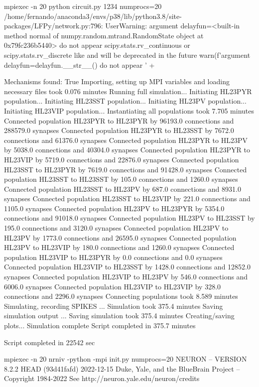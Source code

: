 mpiexec -n 20 python circuit.py 1234
numprocs=20
/home/fernando/anaconda3/envs/p38/lib/python3.8/site-packages/LFPy/network.py:796: UserWarning: argument delayfun=<built-in method normal of numpy.random.mtrand.RandomState object at 0x79fc236b5440> do not appear scipy.stats.rv_continuous or scipy.stats.rv_discrete like and will be deprecated in the future
  warn(f'argument delayfun={delayfun.__str__()} do not appear ' +

Mechanisms found:  True
Importing, setting up MPI variables and loading necessary files took  0.076 minutes
Running full simulation...
Initiating HL23PYR population...
Initiating HL23SST population...
Initiating HL23PV population...
Initiating HL23VIP population...
Instantiating all populations took  7.705 minutes
Connected population HL23PYR to HL23PYR by 96193.0 connections and 288579.0 synapses
Connected population HL23PYR to HL23SST by 7672.0 connections and 61376.0 synapses
Connected population HL23PYR to HL23PV by 5038.0 connections and 40304.0 synapses
Connected population HL23PYR to HL23VIP by 5719.0 connections and 22876.0 synapses
Connected population HL23SST to HL23PYR by 7619.0 connections and 91428.0 synapses
Connected population HL23SST to HL23SST by 105.0 connections and 1260.0 synapses
Connected population HL23SST to HL23PV by 687.0 connections and 8931.0 synapses
Connected population HL23SST to HL23VIP by 221.0 connections and 1105.0 synapses
Connected population HL23PV to HL23PYR by 5354.0 connections and 91018.0 synapses
Connected population HL23PV to HL23SST by 195.0 connections and 3120.0 synapses
Connected population HL23PV to HL23PV by 1773.0 connections and 26595.0 synapses
Connected population HL23PV to HL23VIP by 180.0 connections and 1260.0 synapses
Connected population HL23VIP to HL23PYR by 0.0 connections and 0.0 synapses
Connected population HL23VIP to HL23SST by 1428.0 connections and 12852.0 synapses
Connected population HL23VIP to HL23PV by 546.0 connections and 6006.0 synapses
Connected population HL23VIP to HL23VIP by 328.0 connections and 2296.0 synapses
Connecting populations took  8.589 minutes
Simulating, recording SPIKES ... 
Simulation took  375.4 minutes
Saving simulation output ...
Saving simulation took 375.4 minutes
Creating/saving plots...
Simulation complete
Script completed in  375.7 minutes

Script completed in 22542 sec

mpiexec -n 20 nrniv -python -mpi init.py
numprocs=20
NEURON -- VERSION 8.2.2 HEAD (93d41fafd) 2022-12-15
Duke, Yale, and the BlueBrain Project -- Copyright 1984-2022
See http://neuron.yale.edu/neuron/credits

